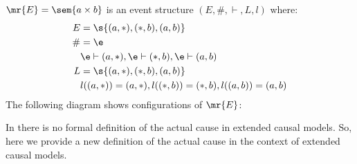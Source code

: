 \begin{example}
    $\mr{E} = \sem{a \times b}$ is an event structure
    $(E,\#,\vdash,L,l)$ where:
    \begin{align*}
        E  & = \s{(a,*),(*,b),(a,b)}                           \\
        \# & = \e                                              \\
           & \e \vdash (a,*), \e \vdash (*,b),\e \vdash (a,b)  \\
        L  & = \s{(a,*),(*,b),(a,b)}                           \\
           & l((a,*)) = (a,*), l((*,b)) = (*,b),l((a,b))=(a,b) 
    \end{align*}
    The following diagram shows configurations of $\mr{E}$:
    \begin{center}
    \end{center}
\end{example}

In \cite{hp} there is no formal definition of the actual cause
in extended causal models.
So, here we provide a new definition of the actual cause
in the context of extended causal models.


